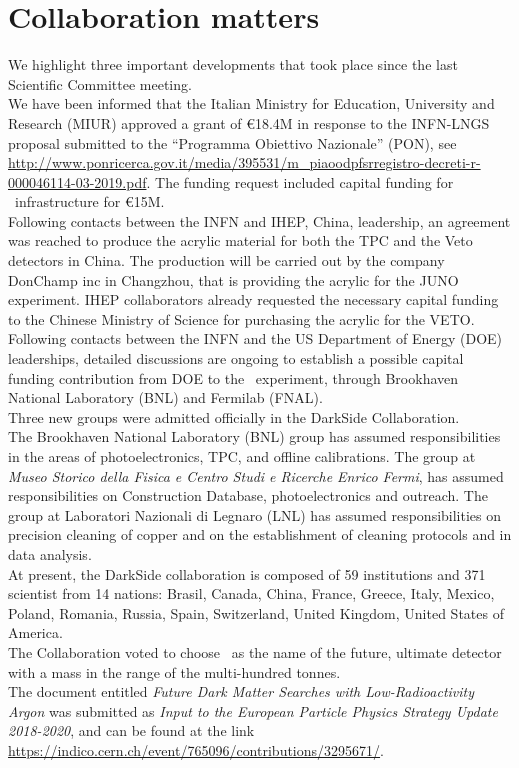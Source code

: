 \section{Collaboration matters}

We highlight three important developments that took place since the last Scientific Committee meeting.\\
We have been informed that the Italian Ministry for Education, University and Research (MIUR) approved a grant of \euro18.4M in response to the INFN-LNGS proposal submitted to the ``Programma Obiettivo Nazionale'' (PON), see\\ \small\url{http://www.ponricerca.gov.it/media/395531/m_piaoodpfsrregistro-decreti-r-000046114-03-2019.pdf}.  The funding request included capital funding for \DSk\ infrastructure for \euro15M.\\
Following contacts between the INFN and IHEP, China, leadership, an agreement was reached to produce the acrylic material for both the TPC and the Veto detectors in China.  The production will be carried out by the company DonChamp inc in Changzhou, that is providing the acrylic for the JUNO experiment.  IHEP collaborators already requested the necessary capital funding to the Chinese Ministry of Science for purchasing the acrylic for the VETO.\\
Following contacts between the INFN and the US Department of Energy (DOE) leaderships, detailed discussions are ongoing to establish a possible capital funding contribution from DOE to the \DSk\ experiment, through Brookhaven National Laboratory (BNL) and Fermilab (FNAL).\\
Three new groups were admitted officially in the DarkSide Collaboration.\\
The Brookhaven National Laboratory (BNL) group has assumed responsibilities in the areas of photoelectronics, TPC, and offline calibrations.  The group at {\it Museo Storico della Fisica e Centro Studi e Ricerche Enrico Fermi}, has assumed responsibilities on Construction Database, photoelectronics and outreach.  The group at Laboratori Nazionali di Legnaro (LNL) has assumed responsibilities on precision cleaning of copper and  on the establishment of cleaning protocols and in data analysis.\\
At present, the DarkSide collaboration is composed of 59 institutions and 371 scientist from 14 nations: Brasil, Canada, China, France, Greece, Italy, Mexico, Poland, Romania, Russia, Spain, Switzerland, United Kingdom, United States of America.\\
The Collaboration voted to choose \Argo\ as the name of the future, ultimate detector with a mass in the range of the multi-hundred tonnes.\\
The document entitled {\it Future Dark Matter Searches with Low-Radioactivity Argon} was submitted as {\em Input to the European Particle Physics Strategy Update 2018-2020}, and can be found at the link \url{https://indico.cern.ch/event/765096/contributions/3295671/}.